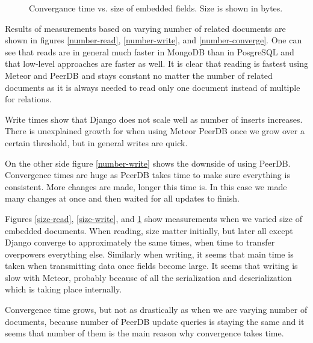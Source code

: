 \begin{figure}%
%
\caption{Convergance time vs. size of embedded fields. Size is shown in bytes.}%
\label{size-converge}%
\end{figure}

Results of measurements based on varying number of related documents are shown in figures \ref{number-read}, \ref{number-write}, and \ref{number-converge}.
One can see that reads are in general much faster in MongoDB than in PosgreSQL and that low-level approaches are faster as well.
It is clear that reading is fastest using Meteor and PeerDB and stays constant no matter the number of related documents as it is always needed to read only one document instead of multiple for relations.

Write times show that Django does not scale well as number of inserts increases. There is unexplained growth for when using Meteor PeerDB once we grow over a certain threshold, but in general writes are quick.

On the other side figure \ref{number-write} shows the downside of using PeerDB. Convergence times are huge as PeerDB takes time to make sure everything is consistent.
More changes are made, longer this time is.
In this case we made many changes at once and then waited for all updates to finish.

Figures \ref{size-read}, \ref{size-write}, and \ref{size-converge} show measurements when we varied size of embedded documents. When reading, size matter initially, but later all except Django converge to approximately the same times, when time to transfer overpowers everything else. Similarly when writing, it seems that main time is taken when transmitting data once fields become large. It seems that writing is slow with Meteor, probably because of all the serialization and deserialization which is taking place internally.

Convergence time grows, but not as drastically as when we are varying number of documents, because number of PeerDB update queries is staying the same and it seems that number of them is the main reason why convergence takes time.